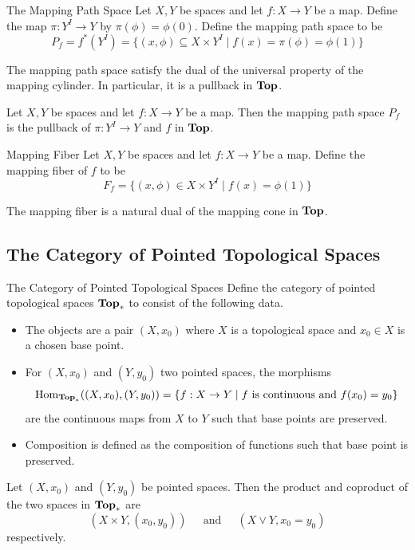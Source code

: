 \documentclass[a4paper]{article}
\begin{document}
\begin{defn}{The Mapping Path Space}{} Let $X,Y$ be spaces and let $f:X\to Y$ be a map. Define the map $\pi:Y^I\to Y$ by $\pi(\phi)=\phi(0)$. Define the mapping path space to be $$P_f=f^\ast(Y^I)=\{(x,\phi)\subseteq X\times Y^I\;|\;f(x)=\pi(\phi)=\phi(1)\}$$
\end{defn}

The mapping path space satisfy the dual of the universal property of the mapping cylinder. In particular, it is a pullback in $\bold{Top}$. 

\begin{prp}{}{} Let $X,Y$ be spaces and let $f:X\to Y$ be a map. Then the mapping path space $P_f$ is the pullback of $\pi:Y^I\to Y$ and $f$ in $\bold{Top}$. 
\end{prp}

\begin{defn}{Mapping Fiber}{} Let $X,Y$ be spaces and let $f:X\to Y$ be a map. Define the mapping fiber of $f$ to be $$F_f=\{(x,\phi)\in X\times Y^I\;|\;f(x)=\phi(1)\}$$
\end{defn}

The mapping fiber is a natural dual of the mapping cone in $\bold{Top}$. 

\subsection{The Category of Pointed Topological Spaces}
\begin{defn}{The Category of Pointed Topological Spaces}{} Define the category of pointed topological spaces $\bold{Top}_\ast$ to consist of the following data. 
\begin{itemize}
\item The objects are a pair $(X,x_0)$ where $X$ is a topological space and $x_0\in X$ is a chosen base point. 
\item For $(X,x_0)$ and $(Y,y_0)$ two pointed spaces, the morphisms $$\operatorname{Hom}_{\bold{Top}_\ast}((X,x_0),(Y,y_0))=\{f:X\to Y\;|\;f\text{ is continuous and }f(x_0)=y_0\}$$ are the continuous maps from $X$ to $Y$ such that base points are preserved. 
\item Composition is defined as the composition of functions such that base point is preserved. 
\end{itemize}
\end{defn}

\begin{prp}{}{} Let $(X,x_0)$ and $(Y,y_0)$ be pointed spaces. Then the product and coproduct of the two spaces in $\bold{Top}_\ast$ are $$(X\times Y,(x_0,y_0))\;\;\;\;\text{ and }\;\;\;\;(X\vee Y,x_0=y_0)$$ respectively. 
\end{prp}
\end{document}
